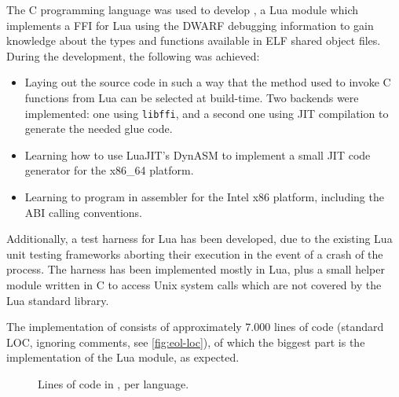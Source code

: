 The C programming language was used to develop \Eol*, a Lua module which
implements a FFI for Lua using the DWARF debugging information to gain
knowledge about the types and functions available in ELF shared object files.
During the development, the following was achieved:

\begin{itemize}

	\item Laying out the source code in such a way that the method used to
	invoke C functions from Lua can be selected at build-time. Two backends
	were implemented: one using \verb|libffi|, and a second one using JIT
	compilation to generate the needed glue code.

	\item Learning how to use LuaJIT's DynASM to implement a small JIT code
	generator for the x86\_64 platform.

	\item Learning to program in assembler for the Intel x86 platform,
	including the \gls{ABI} calling conventions.

\end{itemize}

Additionally, a test harness for Lua has been developed, due to the existing
Lua unit testing frameworks aborting their execution in the event of a crash
of the process. The harness has been implemented mostly in Lua, plus a small
helper module written in C to access Unix system calls which are not covered
by the Lua standard library.

The implementation of \Eol* consists of approximately 7.000 lines of code (standard LOC, ignoring comments, see
\autoref{fig:eol-loc}), of which the biggest part is the implementation of the
\Eol* Lua module, as expected.

\begin{figure}[ht]
	\centering
	\caption{Lines of code in \Eol*, per language.}
	\label{fig:eol-loc}
\end{figure}


